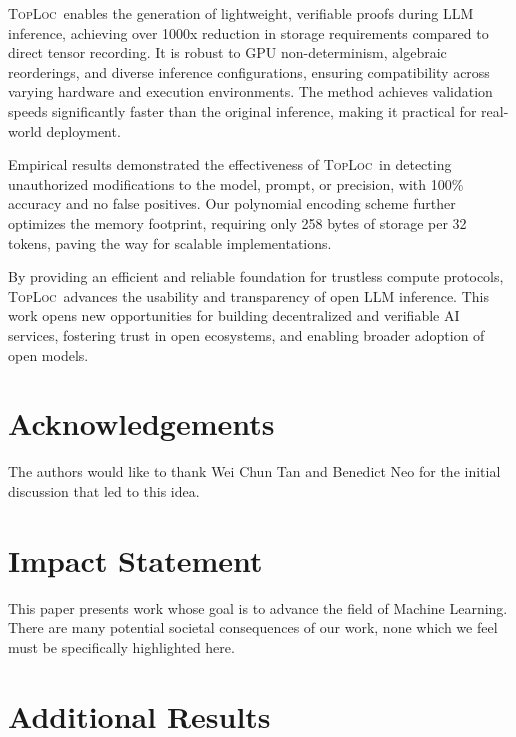 \documentclass{article}
\theoremstyle{plain}
\theoremstyle{definition}
\theoremstyle{remark}
\newcommand{\toploc}{\textsc{TopLoc}}
\begin{document}
\toploc\ enables the generation of lightweight, verifiable proofs during LLM inference, achieving over 1000x reduction in storage requirements compared to direct tensor recording.
It is robust to GPU non-determinism, algebraic reorderings, and diverse inference configurations, ensuring compatibility across varying hardware and execution environments.
The method achieves validation speeds significantly faster than the original inference, making it practical for real-world deployment.

Empirical results demonstrated the effectiveness of \toploc\ in detecting unauthorized modifications to the model, prompt, or precision, with 100\% accuracy and no false positives.
Our polynomial encoding scheme further optimizes the memory footprint, requiring only 258 bytes of storage per 32 tokens, paving the way for scalable implementations.

By providing an efficient and reliable foundation for trustless compute protocols, \toploc\ advances the usability and transparency of open LLM inference.
This work opens new opportunities for building decentralized and verifiable AI services, fostering trust in open ecosystems, and enabling broader adoption of open models.

\section*{Acknowledgements}
The authors would like to thank Wei Chun Tan and Benedict Neo for the initial discussion that led to this idea.

\section*{Impact Statement}
This paper presents work whose goal is to advance the field
of Machine Learning. There are many potential societal
consequences of our work, none which we feel must be
specifically highlighted here.





\newpage
\appendix
\onecolumn

\label{additional_experiment_details}
\section{Additional Results}
\end{document}
